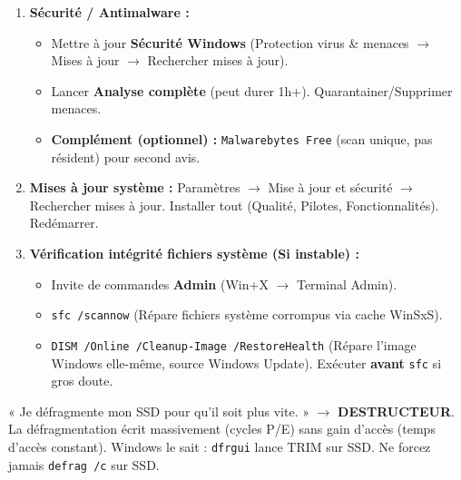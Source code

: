 \documentclass[11pt]{article}
\begin{document}
\begin{methode}
\begin{enumerate}
\begin{itemize}
                  \item Désactiver (Clic droit $\rightarrow$ Désactiver) : Logiciels non essentiels au boot (Spotify, Steam, Chrome Update, OneDrive si non utilisé, constructeurs bloatware). \textbf{Laisser :} Antivirus, Pilotes audio/GPU, Sécurité Windows.
              \end{itemize}
        \item \textbf{Sécurité / Antimalware :}
              \begin{itemize}
                  \item Mettre à jour \textbf{Sécurité Windows} (Protection virus \& menaces $\rightarrow$ Mises à jour $\rightarrow$ Rechercher mises à jour).
                  \item Lancer \textbf{Analyse complète} (peut durer 1h+). Quarantainer/Supprimer menaces.
                  \item \textbf{Complément (optionnel) :} \texttt{Malwarebytes Free} (scan unique, pas résident) pour second avis.
              \end{itemize}
        \item \textbf{Mises à jour système :} Paramètres $\rightarrow$ Mise à jour et sécurité $\rightarrow$ Rechercher mises à jour. Installer tout (Qualité, Pilotes, Fonctionnalités). Redémarrer.
        \item \textbf{Vérification intégrité fichiers système (Si instable) :}
              \begin{itemize}
                  \item Invite de commandes \textbf{Admin} (Win+X $\rightarrow$ Terminal Admin).
                  \item \texttt{sfc /scannow} (Répare fichiers système corrompus via cache WinSxS).
                  \item \texttt{DISM /Online /Cleanup-Image /RestoreHealth} (Répare l'image Windows elle-même, source Windows Update). Exécuter \textbf{avant} \texttt{sfc} si gros doute.
              \end{itemize}
    \end{enumerate}
\end{methode}

\begin{attention}
    « Je défragmente mon SSD pour qu'il soit plus vite. » $\rightarrow$ \textbf{DESTRUCTEUR}. La défragmentation écrit massivement (cycles P/E) sans gain d'accès (temps d'accès constant). Windows le sait : \texttt{dfrgui} lance TRIM sur SSD. Ne forcez jamais \texttt{defrag /c} sur SSD.
\end{attention}
\end{document}
